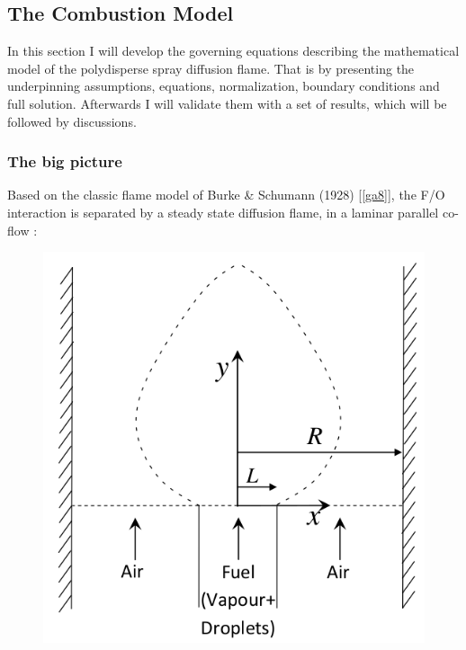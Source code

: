 \documentclass[12pt]{article}
\numberwithin{equation}{section}
\begin{document}
\begin{flushleft}
\newpage

\section{The Combustion Model}
In this section I will develop the governing equations describing the mathematical model of the polydisperse spray diffusion flame. That is by presenting the underpinning assumptions, equations, normalization, boundary conditions and full solution. Afterwards I will validate them with a set of results, which will be followed by discussions.  %


\subsubsection*{The big picture}

Based on the classic flame model of Burke \& Schumann (1928) [\ref{ga8}], the F/O interaction is separated by a steady state diffusion flame, in a laminar parallel co-flow :

\begin{figure}[H]
\centering
\includegraphics[scale=0.425]{model_schema.png}
\end{figure}


\end{flushleft}
\end{document}
